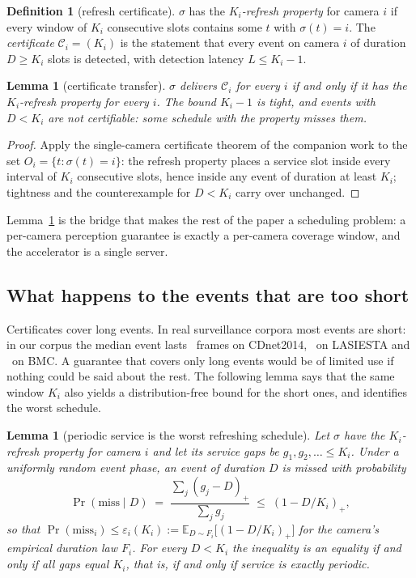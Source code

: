 \documentclass[preprint,review,12pt]{elsarticle}
\newtheorem{lemma}[theorem]{Lemma}
\theoremstyle{definition}
\newtheorem{definition}[theorem]{Definition}
\newcommand{\Ki}{K_i}
\newcommand{\sched}{\sigma}
\newcommand{\Dur}{D}
\newcommand{\Lat}{L}
\newcommand{\pos}[1]{(#1)_{+}}
\begin{document}
\begin{definition}[refresh certificate]\label{def:refresh}
$\sched$ has the \emph{$\Ki$-refresh property} for camera $i$ if every window of $\Ki$ consecutive
slots contains some $t$ with $\sched(t)=i$. The \emph{certificate} $\mathcal{C}_i=(\Ki)$ is the
statement that every event on camera $i$ of duration $\Dur\ge\Ki$ slots is detected, with
detection latency $\Lat\le\Ki-1$.
\end{definition}

\begin{lemma}[certificate transfer]\label{lem:transfer}
$\sched$ delivers $\mathcal{C}_i$ for every $i$ if and only if it has the $\Ki$-refresh property
for every $i$. The bound $\Ki-1$ is tight, and events with $\Dur<\Ki$ are not certifiable: some
schedule with the property misses them.
\end{lemma}
\begin{proof}
Apply the single-camera certificate theorem of the companion work to the set
$O_i=\{t:\sched(t)=i\}$: the refresh property places a service slot inside every interval of
$\Ki$ consecutive slots, hence inside any event of duration at least $\Ki$; tightness and the
counterexample for $\Dur<\Ki$ carry over unchanged.
\end{proof}

Lemma~\ref{lem:transfer} is the bridge that makes the rest of the paper a scheduling problem: a
per-camera perception guarantee is exactly a per-camera coverage window, and the accelerator is a
single server.

\subsection{What happens to the events that are too short}\label{sec:lemma2}
Certificates cover long events. In real surveillance corpora most events are short: in our corpus
the median event lasts \numMedCdnet\ frames on CDnet2014, \numMedLasiesta\ on LASIESTA and
\numMedBmc\ on BMC. A guarantee that covers only long events would be of limited use if nothing
could be said about the rest. The following lemma says that the same window $\Ki$ also yields a
distribution-free bound for the short ones, and identifies the worst schedule.

\begin{lemma}[periodic service is the worst refreshing schedule]\label{lem:worst}
Let $\sched$ have the $\Ki$-refresh property for camera $i$ and let its service gaps be
$g_1,g_2,\dots\le\Ki$. Under a uniformly random event phase, an event of duration $\Dur$ is missed
with probability
\[
\Pr(\text{miss}\mid \Dur)\;=\;\frac{\sum_j \pos{g_j-\Dur}}{\sum_j g_j}\;\le\;\pos{1-\Dur/\Ki},
\]
so that $\Pr(\text{miss}_i)\le \varepsilon_i(\Ki):=\mathbb{E}_{\Dur\sim F_i}\!\big[\pos{1-\Dur/\Ki}\big]$
for the camera's empirical duration law $F_i$. For every $\Dur<\Ki$ the inequality is an equality
if and only if all gaps equal $\Ki$, that is, if and only if service is exactly periodic.
\end{lemma}
\end{document}
